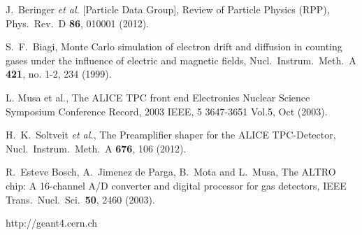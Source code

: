 \documentclass[preprint,5p]{elsarticle}
\begin{document}
\begin{thebibliography}{99}
   J.~Beringer {\it et al.} [Particle Data Group],
  Review of Particle Physics (RPP),
  Phys.\ Rev.\ D {\bf 86}, 010001 (2012).

   S.~F.~Biagi,
  Monte Carlo simulation of electron drift and diffusion in counting gases 
  under the influence of electric and magnetic fields,
  Nucl.\ Instrum.\ Meth.\ A {\bf 421}, no. 1-2, 234 (1999).

 L. Musa et al., The ALICE TPC front end Electronics Nuclear Science Symposium 
 Conference Record, 2003 IEEE, 5 3647-3651 Vol.5, Oct (2003).
 
   H.~K.~Soltveit {\it et al.},
  The Preamplifier shaper for the ALICE TPC-Detector,
  Nucl.\ Instrum.\ Meth.\ A {\bf 676}, 106 (2012).
 
   R.~Esteve Bosch, A.~Jimenez de Parga, B.~Mota and L.~Musa,
  The ALTRO chip: A 16-channel A/D converter and digital processor for gas 
  detectors,
  IEEE Trans.\ Nucl.\ Sci.\  {\bf 50}, 2460 (2003).

http://geant4.cern.ch
 	

\end{thebibliography}
\end{document}
